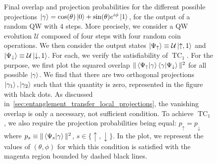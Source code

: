 \documentclass[
	aps, pra,
	superscriptaddress, twocolumn,
	floatfix,
	10pt
]{revtex4-1}
\newcommand{\on}[1]{\operatorname{#1}}
\newcommand{\calU}{{\mathcal{U}}}
\begin{document}
\begin{figure}[tb]
    \centering
    \caption{Final overlap and projection probabilities for the different possible projections $\ket\gamma=\cos(\theta)\ket0+\sin(\theta)e^{i\phi}\ket1$, for the output of a random QW with $4$ steps.
    More precisely, we consider a QW evolution $\calU$ composed of four steps with four random coin operations.
    We then consider the output states $\ket{\Psi_\uparrow}\equiv\calU\ket{\uparrow,1}$ and $\ket{\Psi_\downarrow}\equiv\calU\ket{\downarrow,1}$.
    For each, we verify the satisfiability of $\on{TC}_1$.
    For the purpose, we first plot the squared overlap $\|\braket{\Psi_\uparrow}{\gamma}\braket{\gamma}{\Psi_\downarrow}\|^2$ for all possible $\ket\gamma$.
    We find that there are two orthogonal projections $\ket{\gamma_1},\ket{\gamma_2}$ such that this quantity is zero, represented in the figure with black dots.
    As discussed in~\cref{sec:entanglement_transfer_local_projections}, the vanishing overlap is only a necessary, not sufficient condition. To achieve $\on{TC}_1$, we also require the projection probabilities being equal: $p_\uparrow=p_\downarrow$ where $p_s\equiv \|\braket{\Psi_s}{\gamma}\|^2$, $s\in\{\uparrow,\downarrow\}$.
    In the plot, we represent the values of $(\theta,\phi)$ for which this condition is satisfied with the magenta region bounded by dashed black lines.
}
\end{figure}
\end{document}
